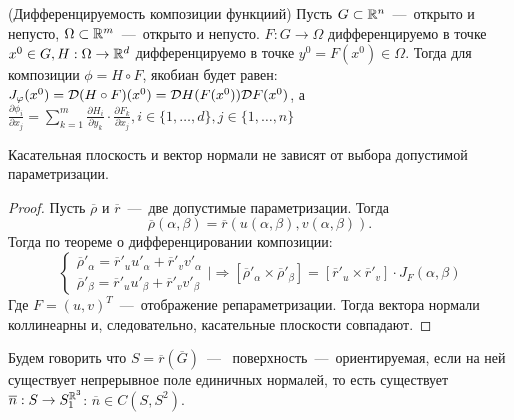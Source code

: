 \begin{reminder}
    (Дифференцируемость композиции функциий)
    Пусть $G \subset \mathbb{R}^n$~---~открыто и непусто, $\Omega \subset \mathbb{R}^m$~---~открыто и непусто. $F: G \rightarrow \Omega$ дифференцируемо в точке $x^0 \in G, H: \Omega \rightarrow \mathbb{R}^d$ дифференцируемо в точке $y^0 = F(x^0) \in \Omega$. Тогда для композиции $\phi = H \circ F$, якобиан будет равен: $J_{\varphi}(x^0) = \mathcal{D}(H \circ F)(x^0) = \mathcal{D} H(F(x^0)) \mathcal{D} F(x^0)$, а $\frac{\partial \phi_i}{\partial x_j} = \sum \limits_{k = 1}^m \frac{\partial H_i}{\partial y_k} \cdot \frac{\partial F_k}{\partial x_j}, i \in \{1, \dots, d\}, j \in \{1, \dots, n\}$
\end{reminder}
\begin{lemma}
    Касательная плоскость и вектор нормали не зависят от выбора допустимой параметризации.
\end{lemma}
\begin{proof}
    Пусть $\overline{\rho}$ и $\overline{r}$~---~две допустимые параметризации. Тогда \[\overline{\rho}(\alpha, \beta) = \overline{r}(u(\alpha, \beta), v(\alpha, \beta)).\]
    Тогда по теореме о дифференцировании композиции:
    \begin{equation*}
    \begin{cases}
            \overline{\rho}'_\alpha = \overline{r}'_uu'_\alpha + \overline{r}'_vv'_\alpha \\
    \overline{\rho}'_\beta = \overline{r}'_uu'_\beta + \overline{r}'_vv'_\beta
    \end{cases}
    \biggr|\Rightarrow [\overline{\rho}'_\alpha \times \overline{\rho}'_\beta] = [\overline{r}'_u \times \overline{r}'_v] \cdot J_F (\alpha, \beta)
    \end{equation*}
    Где $F = (u, v)^T$~---~отображение репараметризации.
    Тогда вектора нормали коллинеарны и, следовательно, касательные плоскости совпадают.
\end{proof}
\begin{definition}
    Будем говорить что $S = \overline{r}(\overline{G})$~---~ поверхность~---~ориентируемая, если на ней существует непрерывное поле единичных нормалей, то есть существует $\overline{n}: S \rightarrow S^{\mathbb{R}^3}_1$: $\overline{n} \in C(S, S^2)$.
\end{definition}

